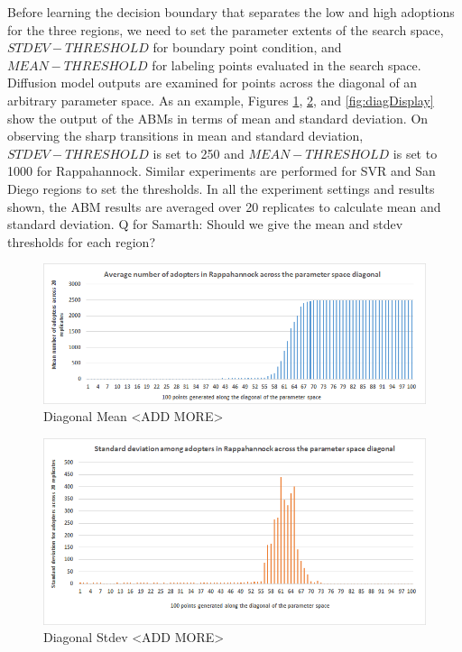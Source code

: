 Before learning the decision boundary that separates the low and high adoptions for the three regions, we need to set the parameter extents of the search space, $STDEV-THRESHOLD$ for boundary point condition, and $MEAN-THRESHOLD$ for labeling points evaluated in the search space. Diffusion model outputs are examined for points across the diagonal of an arbitrary parameter space. As an example, Figures \ref{fig:diagmean}, \ref{fig:diagstdev}, and \ref{fig:diagDisplay} show the output of the ABMs in terms of mean and standard deviation. On observing the sharp transitions in mean and standard deviation, $STDEV-THRESHOLD$ is set to 250 and $MEAN-THRESHOLD$ is set to 1000 for Rappahannock. Similar experiments are performed for SVR and San Diego regions to set the thresholds.
In all the experiment settings and results shown, the ABM results are averaged over 20 replicates to calculate mean and standard deviation. 
{\color{magenta} Q for Samarth: Should we give the mean and stdev thresholds for each region?}

\begin{figure}
    \centering
    \includegraphics{AAMAS20Template-submission/figures/rapp-diag-mean1.png}
    \caption{Diagonal Mean <ADD MORE>}
    \label{fig:diagmean}
\end{figure}

\begin{figure}
    \centering
    \includegraphics{AAMAS20Template-submission/figures/rapp-diag-stdev1.png}
    \caption{Diagonal Stdev <ADD MORE>}
    \label{fig:diagstdev}
\end{figure}

